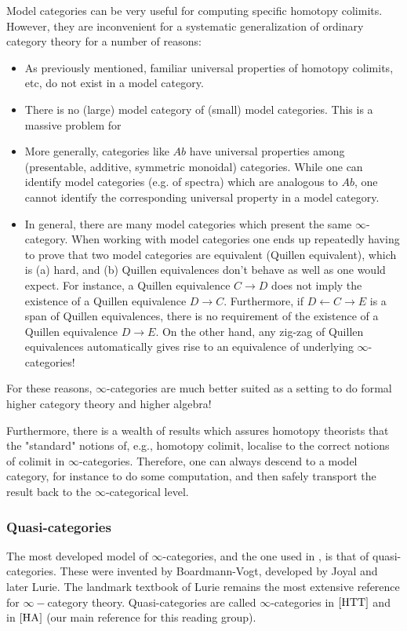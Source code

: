 Model categories can be very useful for computing specific homotopy colimits. However, they are inconvenient for a systematic generalization of ordinary category theory for a number of reasons:
\begin{itemize}
    \item As previously mentioned, familiar universal properties of homotopy colimits, etc, do not exist in a model category.
    \item There is no (large) model category of (small) model categories. This is a massive problem for 
    \item More generally, categories like $Ab$ have universal properties among (presentable, additive, symmetric monoidal) categories. While one can identify model categories (e.g. of spectra) which are analogous to $Ab$, one cannot identify the corresponding universal property in a model category.
    \item In general, there are many model categories which present the same $\infty$-category. When working with model categories one ends up repeatedly having to prove that two model categories are equivalent (Quillen equivalent), which is (a) hard, and (b) Quillen equivalences don't behave as well as one would expect. For instance, a Quillen equivalence $C\rightarrow D$ does not imply the existence of a Quillen equivalence $D\rightarrow C$. Furthermore, if $D\leftarrow C\rightarrow E$ is a span of Quillen equivalences, there is no requirement of the existence of a Quillen equivalence $D\rightarrow E$. On the other hand, any zig-zag of Quillen equivalences automatically gives rise to an equivalence of underlying $\infty$-categories!
\end{itemize}

For these reasons, $\infty$-categories are much better suited as a setting to do formal higher category theory and higher algebra! 

Furthermore, there is a wealth of results which assures homotopy theorists that the "standard" notions of, e.g., homotopy colimit, localise to the correct notions of colimit in $\infty$-categories. Therefore, one can always descend to a model category, for instance to do some computation, and then safely transport the result back to the $\infty$-categorical level.

\subsubsection{Quasi-categories}
The most developed model of $\infty$-categories, and the one used in \cite{HA}, is that of quasi-categories. These were invented by Boardmann-Vogt, developed by Joyal and later Lurie. The landmark textbook \cite{HTT} of Lurie remains the most extensive reference for $\infty-$category theory. Quasi-categories are called $\infty$-categories in $\cite{HTT}$ and in $\cite{HA}$ (our main reference for this reading group).

